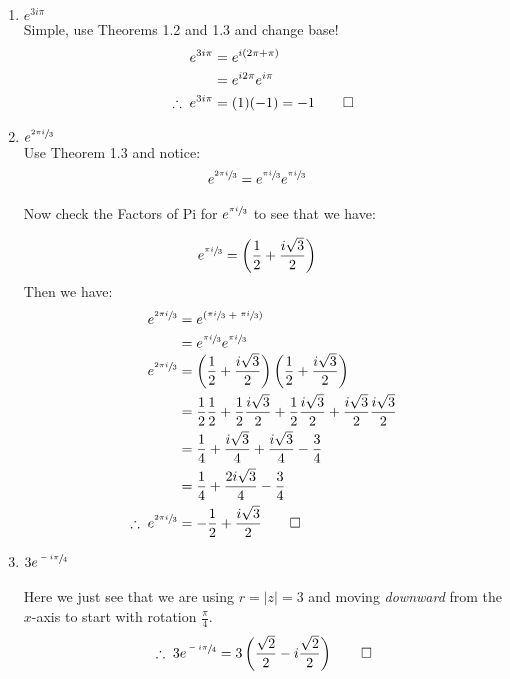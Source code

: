 \begin{enumerate}
\begin{enumerate}
		\item $e^{3i\pi}$ \\
		Simple, use Theorems 1.2 and 1.3 and change base!
		\begin{align*}
			e^{3i\pi} &= e^{i(2\pi + \pi)} \\
			&= e^{i2\pi}e^{i\pi} \\
			\therefore \; e^{3i\pi} &= (1)(-1) = -1 \qed
		\end{align*}


		\item $e^{\sfrac{2\pi i}{3}}$ \\
		Use Theorem 1.3 and notice:
		\begin{align*}
			e^{\sfrac{2\pi i}{3}} &= e^{\sfrac{\pi i}{3}}e^{\sfrac{\pi i}{3}}
		\end{align*} 

		Now check the Factors of Pi for $e^{\sfrac{\pi i}{3}}$ to see that we have:

		\begin{align*}
			e^{\sfrac{\pi i}{3}} &= \left( \frac{1}{2} + \frac{i\sqrt{3}}{2} \right)
		\end{align*}
		Then we have:
		\begin{align*}
			e^{\sfrac{2\pi i}{3}} &= e^{(\sfrac{\pi i}{3} \; + \; \sfrac{\pi i}{3} )} \\
			&= e^{\sfrac{\pi i}{3}} e^{\sfrac{\pi i}{3}} \\
			e^{\sfrac{2\pi i}{3}} &= \left( \frac{1}{2} + \frac{i\sqrt{3}}{2} \right) \left( \frac{1}{2} + \frac{i\sqrt{3}}{2} \right) \\
			&= \frac{1}{2} \frac{1}{2} + \frac{1}{2} \frac{i \sqrt{3}}{2} + \frac{1}{2} \frac{i \sqrt{3}}{2} + \frac{i \sqrt{3}}{2} \frac{i \sqrt{3}}{2} \\
			&= \frac{1}{4} +\frac{i \sqrt{3}}{4} + \frac{i \sqrt{3}}{4} - \frac{3}{4} \\
			&= \frac{1}{4} + \frac{2i \sqrt{3}}{4} - \frac{3}{4} \\
			\therefore \; e^{\sfrac{2\pi i}{3}} &=  - \frac{1}{2} + \frac{i \sqrt{3}}{2}  \qed \\
		\end{align*}
		

		\item $3e^{\sfrac{-i\pi}{4}}$ \\
		\\
		Here we just see that we are using $r = |z| = 3$ and moving \textit{downward} from the $x$-axis to start with rotation $\frac{\pi}{4}.$
		\begin{align*}
			\therefore \; 3e^{\sfrac{-i\pi}{4}} &= 3 \left( \frac{\sqrt{2}}{2} - i\frac{\sqrt{2}}{2} \right) \qed \\
		\end{align*}



\end{enumerate}
\end{enumerate}
